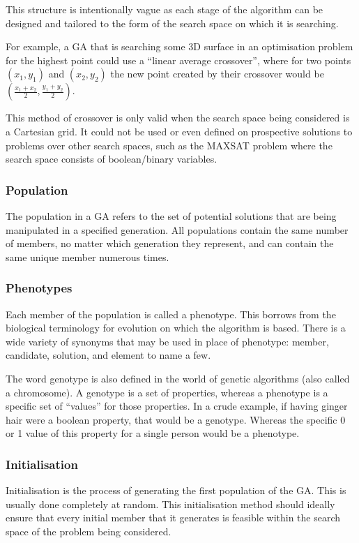 This structure is intentionally vague as each stage of the algorithm can be designed and tailored to the form of the search space on which it is searching. \newline

For example, a GA that is searching some 3D surface in an optimisation problem for the highest point could use a ``linear average crossover'', where for two points $(x_{1}, y_{1})$ and $(x_{2}, y_{2})$ the new point created by their crossover would be $(\frac{x_{1} + x_{2}}{2}, \frac{y_{1} + y_{2}}{2})$. \newline

This method of crossover is only valid when the search space being considered is a Cartesian grid. It could not be used or even defined on prospective solutions to problems over other search spaces, such as the MAXSAT problem where the search space consists of boolean/binary variables.

\subsubsection{Population} \label{Population}
The population in a GA refers to the set of potential solutions that are being manipulated in a specified generation. All populations contain the same number of members, no matter which generation they represent, and can contain the same unique member numerous times.

\subsubsection{Phenotypes} \label{chromosome}
Each member of the population is called a phenotype. This borrows from the biological terminology for evolution on which the algorithm is based. There is a wide variety of synonyms that may be used in place of phenotype: member, candidate, solution, and element to name a few. \newline

The word genotype is also defined in the world of genetic algorithms (also called a chromosome). A genotype is a set of properties, whereas a phenotype is a specific set of ``values'' for those properties. In a crude example, if having ginger hair were a boolean property, that would be a genotype. Whereas the specific 0 or 1 value of this property for a single person would be a phenotype.

\subsubsection{Initialisation} \label{Initialisation}
Initialisation is the process of generating the first population of the GA. This is usually done completely at random. This initialisation method should ideally ensure that every initial member that it generates is feasible within the search space of the problem being considered.

